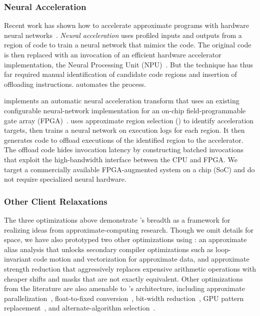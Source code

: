 \subsubsection{Neural Acceleration}
\label{sec:npu}

Recent work has shown how to accelerate approximate programs with hardware
neural networks~\cite{benchnn, temam-isca, temam-isca13}.
\textit{Neural acceleration} uses profiled inputs and outputs from a region of
code to train a neural network that mimics the code.
The original code is then replaced with an invocation of an
efficient hardware accelerator implementation, the Neural Processing Unit
(NPU)~\cite{npu, anpu, snnap}.
But the technique has thus far required manual identification of candidate
code regions and insertion of offloading instructions.
\sysname automates the process.

\sysname implements an automatic neural acceleration transform
that uses an existing configurable neural-network implementation
for an on-chip field-programmable gate array (FPGA)~\cite{snnap}.
\sysname uses approximate region selection () to
identify acceleration targets, then trains a neural network on
execution logs for each region.
It then generates code to offload executions of the identified region to the
accelerator.
The offload code hides invocation latency by constructing batched invocations
that exploit the high-bandwidth interface between the CPU and FPGA.
We target a commercially available FPGA-augmented system on a chip (SoC) and
do not require specialized neural hardware.

\subsubsection{Other Client Relaxations}
The three optimizations above demonstrate \sysname's breadth as a
framework for realizing ideas from approximate-computing research.
Though we omit details for space, we have also prototyped
two other optimizations using \sysname:
an approximate alias analysis that unlocks secondary compiler optimizations such as
loop-invariant code motion and vectorization for approximate data, and
approximate strength reduction that aggressively replaces expensive arithmetic
operations with cheaper shifts and masks that are not exactly equivalent.
Other optimizations from the literature are also amenable to \sysname's
architecture, including approximate parallelization~\cite{quickstep},
float-to-fixed conversion~\cite{torftf},
bit-width reduction~\cite{bitwidthred, precimonious}, GPU pattern replacement~\cite{paraprox},
and alternate-algorithm selection~\cite{green, petabricks}.

